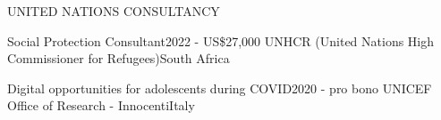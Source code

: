 \begin{rSection}{UNITED NATIONS CONSULTANCY}

\begin{rSubsection}
{Social Protection Consultant}{2022 - US\$27,000}
{UNHCR (United Nations High Commissioner for Refugees)}{South Africa}\par
\end{rSubsection}

\begin{rSubsection}
{Digital opportunities for adolescents during COVID}{2020 - pro bono}
{UNICEF Office of Research - Innocenti}{Italy}\par
\end{rSubsection}

\end{rSection}